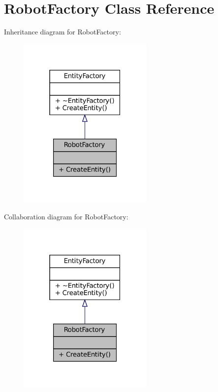 \hypertarget{classRobotFactory}{}\section{Robot\+Factory Class Reference}
\label{classRobotFactory}


Inheritance diagram for Robot\+Factory\+:\nopagebreak
\begin{figure}[H]
\begin{center}
\leavevmode
\includegraphics[width=187pt]{classRobotFactory__inherit__graph}
\end{center}
\end{figure}


Collaboration diagram for Robot\+Factory\+:\nopagebreak
\begin{figure}[H]
\begin{center}
\leavevmode
\includegraphics[width=187pt]{classRobotFactory__coll__graph}
\end{center}
\end{figure}
